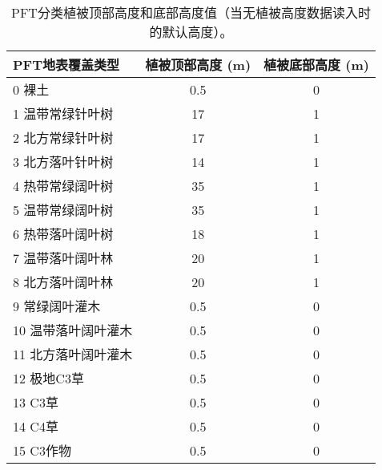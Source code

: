\begin{table}[]
    \centering
    \caption{PFT分类植被顶部高度和底部高度值（当无植被高度数据读入时的默认高度）。}
    \label{tab:PFT分类植被顶部高度和底部高度值}
    \begin{tabular}{@{}lcc@{}}
    \toprule
    PFT地表覆盖类型     & 植被顶部高度 (m) & 植被底部高度 (m) \\ \midrule
    0 裸土           & 0.5          & 0          \\ \midrule
    1 温带常绿针叶树   & 17           & 1          \\
    2 北方常绿针叶树   & 17           & 1          \\
    3 北方落叶针叶树   & 14           & 1          \\
    4 热带常绿阔叶树   & 35           & 1          \\
    5 温带常绿阔叶树   & 35           & 1          \\
    6 热带落叶阔叶树   & 18           & 1          \\
    7 温带落叶阔叶林   & 20           & 1          \\
    8 北方落叶阔叶林   & 20           & 1          \\
    9 常绿阔叶灌木    & 0.5          & 0           \\
    10 温带落叶阔叶灌木 & 0.5          & 0          \\
    11 北方落叶阔叶灌木 & 0.5          & 0          \\
    12 极地C3草    & 0.5          & 0          \\
    13 C3草      & 0.5          & 0          \\
    14 C4草      & 0.5          & 0          \\
    15 C3作物     & 0.5          & 0          \\ \bottomrule

    \end{tabular}
\end{table}

